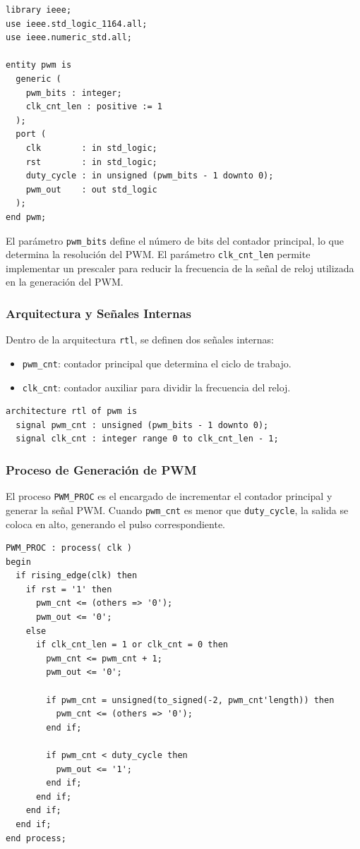\documentclass[a4paper,12pt]{article}
\begin{document}
\begin{lstlisting}[caption={Entidad del módulo PWM}, label={lst:pwm_entity}]
library ieee;
use ieee.std_logic_1164.all;
use ieee.numeric_std.all;

entity pwm is
  generic (
    pwm_bits : integer;
    clk_cnt_len : positive := 1
  );
  port (
    clk        : in std_logic;
    rst        : in std_logic;
    duty_cycle : in unsigned (pwm_bits - 1 downto 0);
    pwm_out    : out std_logic
  );
end pwm;
\end{lstlisting}

El parámetro \texttt{pwm\_bits} define el número de bits del contador principal, lo que determina la resolución del PWM. El parámetro \texttt{clk\_cnt\_len} permite implementar un prescaler para reducir la frecuencia de la señal de reloj utilizada en la generación del PWM.

\subsubsection*{Arquitectura y Señales Internas}

Dentro de la arquitectura \texttt{rtl}, se definen dos señales internas: 

\begin{itemize}
    \item \texttt{pwm\_cnt}: contador principal que determina el ciclo de trabajo.
    \item \texttt{clk\_cnt}: contador auxiliar para dividir la frecuencia del reloj.
\end{itemize}

\begin{lstlisting}[caption={Definición de señales internas}, label={lst:pwm_signals}]
architecture rtl of pwm is
  signal pwm_cnt : unsigned (pwm_bits - 1 downto 0);
  signal clk_cnt : integer range 0 to clk_cnt_len - 1;
\end{lstlisting}

\subsubsection*{Proceso de Generación de PWM}

El proceso \texttt{PWM\_PROC} es el encargado de incrementar el contador principal y generar la señal PWM. Cuando \texttt{pwm\_cnt} es menor que \texttt{duty\_cycle}, la salida se coloca en alto, generando el pulso correspondiente.

\begin{lstlisting}[caption={Proceso de generación de PWM}, label={lst:pwm_proc}]
PWM_PROC : process( clk )
begin
  if rising_edge(clk) then
    if rst = '1' then
      pwm_cnt <= (others => '0');
      pwm_out <= '0';
    else
      if clk_cnt_len = 1 or clk_cnt = 0 then
        pwm_cnt <= pwm_cnt + 1;
        pwm_out <= '0';

        if pwm_cnt = unsigned(to_signed(-2, pwm_cnt'length)) then
          pwm_cnt <= (others => '0');
        end if;

        if pwm_cnt < duty_cycle then
          pwm_out <= '1';
        end if;
      end if;
    end if;
  end if;
end process;
\end{lstlisting}
\end{document}
